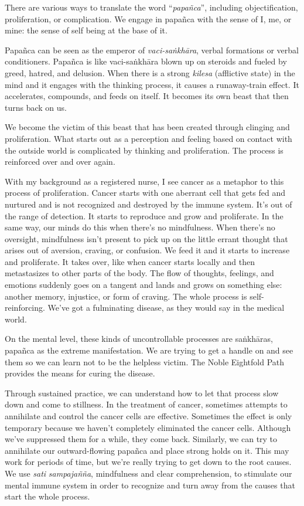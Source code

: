 There are various ways to translate the word ``\emph{papañca}'', including objectification, proliferation, or complication. We engage in papañca with the sense of I, me, or mine: the sense of self being at the base of it.

Papañca can be seen as the emperor of \emph{vaci-saṅkhāra}, verbal formations or verbal conditioners. Papañca is like vaci-saṅkhāra blown up on steroids and fueled by greed, hatred, and delusion. When there is a strong \emph{kilesa} (afflictive state) in the mind and it engages with the thinking process, it causes a runaway-train effect. It accelerates, compounds, and feeds on itself. It becomes its own beast that then turns back on us.

We become the victim of this beast that has been created through clinging and proliferation. What starts out as a perception and feeling based on contact with the outside world is complicated by thinking and proliferation. The process is reinforced over and over again.

With my background as a registered nurse, I see cancer as a metaphor to this process of proliferation. Cancer starts with one aberrant cell that gets fed and nurtured and is not recognized and destroyed by the immune system. It's out of the range of detection. It starts to reproduce and grow and proliferate. In the same way, our minds do this when there's no mindfulness. When there's no oversight, mindfulness isn't present to pick up on the little errant thought that arises out of aversion, craving, or confusion. We feed it and it starts to increase and proliferate. It takes over, like when cancer starts locally and then metastasizes to other parts of the body. The flow of thoughts, feelings, and emotions suddenly goes on a tangent and lands and grows on something else: another memory, injustice, or form of craving. The whole process is self-reinforcing. We've got a fulminating disease, as they would say in the medical world.

On the mental level, these kinds of uncontrollable processes are saṅkhāras, papañca as the extreme manifestation. We are trying to get a handle on and see them so we can learn not to be the helpless victim. The Noble Eightfold Path provides the means for curing the disease.

Through sustained practice, we can understand how to let that process slow down and come to stillness. In the treatment of cancer, sometimes attempts to annihilate and control the cancer cells are effective. Sometimes the effect is only temporary because we haven't completely eliminated the cancer cells. Although we've suppressed them for a while, they come back. Similarly, we can try to annihilate our outward-flowing papañca and place strong holds on it. This may work for periods of time, but we're really trying to get down to the root causes. We use \emph{sati} \emph{sampajañña}, mindfulness and clear comprehension, to stimulate our mental immune system in order to recognize and turn away from the causes that start the whole process.

